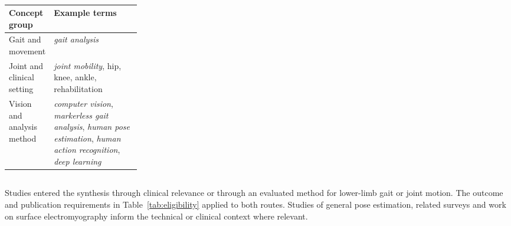 \begin{table}[!htbp]
\centering\small
\caption{}
\label{tab:search_concepts}
\color{RevisionRed}
\renewcommand{\arraystretch}{1.08}
\begin{tabularx}{0.98\linewidth}{@{}p{0.26\linewidth}>{\raggedright\arraybackslash}X@{}}
\toprule
\textbf{Concept group} & \textbf{Example terms} \\
\midrule
Gait and movement & \emph{gait analysis} \\
Joint and clinical setting & \emph{joint mobility}, hip, knee, ankle, rehabilitation \\
Vision and analysis method & \emph{computer vision}, \emph{markerless gait analysis}, \emph{human pose estimation}, \emph{human action recognition}, \emph{deep learning} \\
\bottomrule
\end{tabularx}
\end{table}

\subsection{}
\label{sec:eligibility}
\begin{redrevision}
Studies entered the synthesis through clinical relevance or through an evaluated method for lower-limb gait or joint motion. The outcome and publication requirements in Table~\ref{tab:eligibility} applied to both routes. Studies of general pose estimation, related surveys and work on surface electromyography inform the technical or clinical context where relevant.
\end{redrevision}

